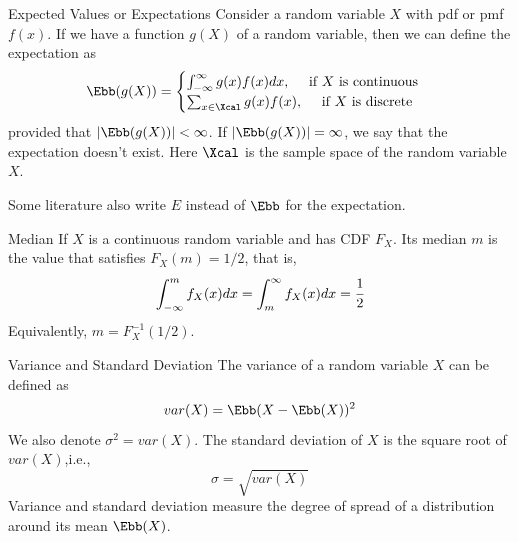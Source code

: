 \documentclass[aspectratio=169,xcolor=dvipsnames,svgnames,x11names,fleqn]{beamer}
\begin{document}
    \begin{frame}{Expected Values or Expectations}
        Consider a random variable $X$ with pdf or pmf $f(x)$.
        If we have a function $g(X)$ of a random variable, then we can define the expectation as 
        \begin{equation}
            \Ebb( g(X)) = \begin{cases}
                \int_{-\infty}^\infty g(x) f(x) dx, \quad \text{~if~} X \text{~is continuous}\\
                \sum_{x\in \Xcal} g(x) f(x), \quad \text{~if~} X \text{~is discrete}
            \end{cases}
        \end{equation}
    provided that $|\Ebb(g(X))| < \infty$. If $|\Ebb(g(X))| = \infty$, we say that the expectation doesn't exist. Here $\Xcal$ is the sample space of the random variable $X$.
    
    Some literature also write $E$ instead of $\Ebb$ for the expectation.
    
    {\color{red}{Expectation is also referred to as mean or average.}}
    \end{frame}
    
    \begin{frame}{Median}
        If $X$ is a continuous random variable and has CDF $F_X$. Its median $m$ is the value that satisfies $F_X(m) = 1/2$, that is,
        \begin{equation}
            \int_{-\infty}^m f_X(x) dx = \int_m^\infty f_X(x)dx = \cfrac{1}{2}
        \end{equation}
        Equivalently, $m = F^{-1}_X (1/2)$.
    \end{frame}
    
    \begin{frame}{Variance and Standard Deviation}
    The variance of a random variable $X$ can be defined as 
    \begin{equation}
        var(X) = \Ebb(X - \Ebb(X))^2
    \end{equation}
    We also denote $\sigma^2 = var(X)$. The standard deviation of $X$ is the square root of $var(X)$,i.e.,
    \begin{equation}
        \sigma = \sqrt{var(X)}
    \end{equation}
    Variance and standard deviation measure the degree of spread of a distribution around its mean $\Ebb(X)$.
    \end{frame}
\end{document}
